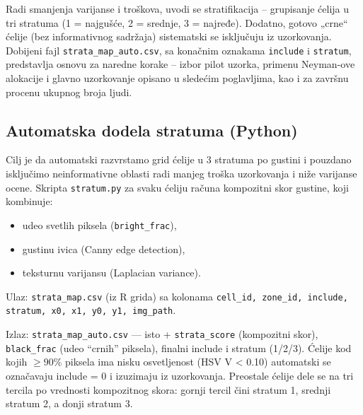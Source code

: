 \documentclass[a4paper,12pt]{article}
\begin{document}
Radi smanjenja varijanse i troškova, uvodi se stratifikacija – grupisanje ćelija u tri stratuma (1 = najgušće, 2 = srednje, 3 = najređe).
Dodatno, gotovo „crne“ ćelije (bez informativnog sadržaja) sistematski se isključuju iz uzorkovanja.
\noindent
Dobijeni fajl \texttt{strata\_map\_auto.csv}, sa konačnim oznakama \texttt{include} i \texttt{stratum}, predstavlja osnovu za naredne korake – izbor pilot uzorka, primenu Neyman-ove alokacije i glavno uzorkovanje opisano u sledećim poglavljima, kao i za završnu procenu ukupnog broja ljudi.


\subsection{Automatska dodela stratuma (Python)}

Cilj je da automatski razvrstamo grid ćelije u 3 stratuma po gustini i pouzdano isključimo neinformativne oblasti radi manjeg troška uzorkovanja i niže varijanse ocene.
Skripta \texttt{stratum.py} za svaku ćeliju računa kompozitni skor gustine, koji kombinuje:
\begin{itemize}
    \item udeo svetlih piksela (\texttt{bright\_frac}),
    \item gustinu ivica (Canny edge detection),
    \item teksturnu varijansu (Laplacian variance).
\end{itemize}


\noindent Ulaz: \texttt{strata\_map.csv} (iz R grida) sa kolonama
\texttt{cell\_id, zone\_id, include, stratum, x0, x1, y0, y1, img\_path}.

\noindent Izlaz: \texttt{strata\_map\_auto.csv} — isto +
\texttt{strata\_score} (kompozitni skor), \texttt{black\_frac} (udeo “crnih” piksela), finalni include i stratum (1/2/3).
\newline
\newline
\noindent Ćelije kod kojih $ \ge 90\% $ piksela ima nisku osvetljenost (HSV V < 0.10) automatski se označavaju include = 0 i izuzimaju iz uzorkovanja. 
Preostale ćelije dele se na tri tercila po vrednosti kompozitnog skora: gornji tercil čini stratum 1, srednji stratum 2, a donji stratum 3.
\end{document}
